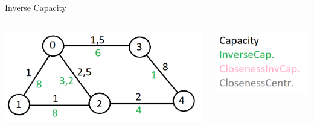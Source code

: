 \documentclass[aspectratio=169,10pt]{beamer}
\begin{document}
\begin{frame}{Inverse Capacity}
\begin{columns}
\begin{column}[t]{0.7\paperwidth}
\includegraphics[width=\textwidth]{images/kai2.png}
\end{column}
\begin{column}[t]{0.3\paperwidth}
\includegraphics[width=\textwidth]{images/kai_legend.png}
\end{column}
\end{columns}
\end{frame}
\end{document}
